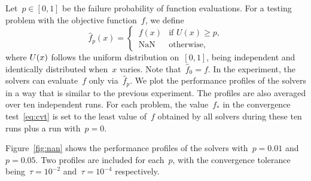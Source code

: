 \documentclass[
    smallextended,  %
    final,          %
]{svjour3}
\newcommand{\iter}[1][k]{x\ifthenelse{\equal{#1}{}}{}{_{#1}}}
\newcommand{\obj}{f}
\begin{document}
Let~$p \in [0,1]$ be the failure probability of function evaluations.
For a testing problem with the objective function~$\obj$, we define
\begin{equation}
    \label{eq:nan-obj}
    \hat{\obj}_p(x) = \begin{cases}
        \,\obj(x) & \text{if~$U(x) \ge  p$}, \\[0.5ex]
        \,\text{NaN} & \text{otherwise},
    \end{cases}
\end{equation}
where $U(\iter[])$ follows the uniform distribution on~$[0,1]$, being independent and identically distributed when~$x$ varies.
Note that~$\hat{\obj}_0 = f$.
In the experiment, the solvers can evaluate~$\obj$ only via~$\hat{\obj}_p$.
We plot the performance profiles of the solvers in a way that is similar to the previous experiment.
The profiles are also averaged over ten independent runs. For each problem, the
value~$\obj_{\ast}$ in the convergence test~\eqref{eq:cvt} is set to the least value of~$\obj$ obtained
by all solvers during these ten runs plus a run with~$p = 0$.

Figure~\ref{fig:nan} shows the performance profiles of the solvers with~$p = 0.01$ and~$p=0.05$.
Two profiles are included for each~$p$, with the convergence tolerance being~$\tau = 10^{-2}$ and~$\tau = 10^{-4}$ respectively.
\end{document}
